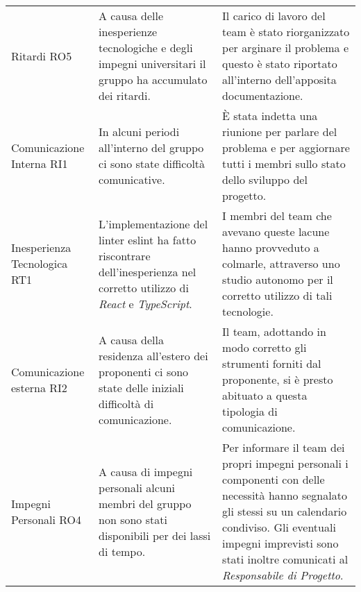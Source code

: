 \begin{center}
\begin{table}[h!]
\begin{tabular}{p{90px} p{160px} p{160px}}
            Ritardi RO5                           & A causa delle inesperienze tecnologiche e degli impegni universitari il gruppo ha accumulato dei ritardi.                                                                                                                                                                                     & Il carico di lavoro del team è stato riorganizzato per arginare il problema e questo è stato riportato all'interno dell'apposita documentazione.                                                \\
            Comunicazione \newline Interna RI1    & In alcuni periodi all'interno del gruppo ci sono state difficoltà comunicative.                                                                                                                                                                                                               & È stata indetta una riunione per parlare del problema e per aggiornare tutti i membri sullo stato dello sviluppo del progetto.                                                                 \\
            Inesperienza \newline Tecnologica RT1 & L'implementazione del linter eslint ha fatto riscontrare dell'inesperienza nel corretto utilizzo di \textit{React} e \newline \textit{TypeScript}.                                                                                                                                                & I membri del team che avevano queste lacune hanno provveduto a colmarle, attraverso uno studio autonomo per il corretto utilizzo di tali tecnologie.                                                \\
            Comunicazione \newline esterna RI2    & A causa della residenza all'estero dei proponenti ci sono state delle iniziali difficoltà di comunicazione.                                                                                                                                                                                   & Il team, adottando in modo corretto gli strumenti forniti dal proponente, si è presto abituato a questa tipologia di comunicazione. \\


            Impegni Personali \newline RO4 & A causa di impegni personali alcuni membri del gruppo non sono stati disponibili per dei lassi di tempo. & Per informare il team dei propri impegni personali i componenti con delle necessità hanno segnalato gli stessi su un calendario condiviso. Gli eventuali impegni imprevisti sono stati inoltre comunicati al \textit{Responsabile di Progetto}.

        \end{tabular}
    \end{table}
\end{center}

